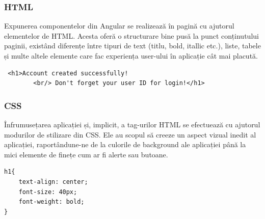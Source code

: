 \begin{minipage}{\textwidth}
\hfill
\begin{minipage}{0.9\textwidth}
\subsubsection{HTML}
\end{minipage}
\end{minipage}

\hspace{0cm} Expunerea componentelor din Angular se realizează în pagină cu ajutorul elementelor de HTML. Acesta oferă o structurare bine pusă la punct conținutului paginii, existând diferențe între tipuri de text (titlu, bold, itallic etc.), liste, tabele și multe altele elemente care fac experiența user-ului în aplicație cât mai placută. 

\begin{center}
\begin{minipage}{0.8\textwidth}
\captionsetup{type=listing}
   \begin{lstlisting}
 <h1>Account created successfully!
        <br/> Don't forget your user ID for login!</h1>
\end{lstlisting} 
\end{minipage}
\end{center}

\vspace{0.5em}

\begin{minipage}{\textwidth}
\hfill
\begin{minipage}{0.9\textwidth}
\subsubsection{CSS}
\end{minipage}
\end{minipage}

\hspace{0cm} Înfrumusețarea aplicației și, implicit, a tag-urilor HTML se efectuează cu ajutorul modurilor de stilizare din CSS. Ele au scopul să creeze un aspect vizual inedit al aplicației, raportândune-ne de la culorile de background ale aplicației până la mici elemente de finețe cum ar fi alerte sau butoane.

\begin{center}
\begin{minipage}{0.8\textwidth}
\captionsetup{type=listing}
   \begin{lstlisting}
h1{
    text-align: center;
    font-size: 40px;
    font-weight: bold;
}
\end{lstlisting} 
\end{minipage}
\end{center}

